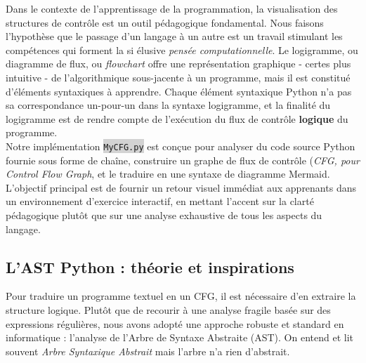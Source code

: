 \documentclass[11pt,a4paper]{article}
\newcommand{\code}[1]{\colorbox{lightgray}{\texttt{\small #1}}}
\begin{document}
Dans le contexte de l'apprentissage de la programmation, la visualisation des structures de contrôle est un outil pédagogique fondamental. Nous faisons l'hypothèse que le passage d'un langage à un autre est un travail stimulant les compétences qui forment la si élusive \textit{pensée computationnelle}. Le logigramme, ou diagramme de flux, ou \textit{flowchart} offre une représentation graphique - certes plus intuitive - de l'algorithmique sous-jacente à un programme, mais il est constitué d'éléments syntaxiques à apprendre. Chaque élément syntaxique Python n'a pas sa correspondance un-pour-un dans la syntaxe logigramme, et la finalité du logigramme est de rendre compte de l'exécution du flux de contrôle \textbf{logique} du programme. \\
Notre implémentation \code{MyCFG.py} est conçue pour analyser du code source Python fournie sous forme de chaîne, construire un graphe de flux de contrôle (\textit{CFG, pour Control Flow Graph}, et le traduire en une syntaxe de diagramme Mermaid. L'objectif principal est de fournir un retour visuel immédiat aux apprenants dans un environnement d'exercice interactif, en mettant l'accent sur la clarté pédagogique plutôt que sur une analyse exhaustive de tous les aspects du langage.

\subsection{L'AST Python : théorie et inspirations}

Pour traduire un programme textuel en un CFG, il est nécessaire d'en extraire la structure logique. Plutôt que de recourir à une analyse fragile basée sur des expressions régulières, nous avons adopté une approche robuste et standard en informatique : l'analyse de l'Arbre de Syntaxe Abstraite (AST). On entend et lit souvent \textit{Arbre Syntaxique Abstrait} mais l'arbre n'a rien d'abstrait.
\end{document}
